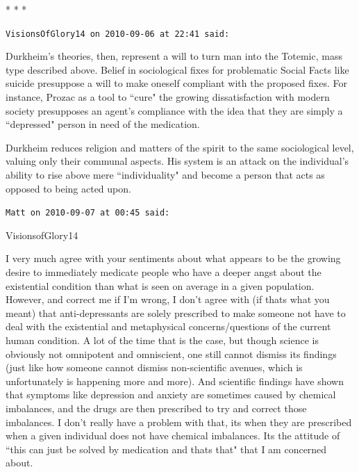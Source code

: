 
\begin{center}* * *\end{center}

\begin{footnotesize}\begin{sffamily}



\texttt{VisionsOfGlory14 on 2010-09-06 at 22:41 said: }

Durkheim's theories, then, represent a will to turn man into the Totemic, mass type described above. Belief in sociological fixes for problematic Social Facts like suicide presuppose a will to make oneself compliant with the proposed fixes. For instance, Prozac as a tool to ``cure" the growing dissatisfaction with modern society presupposes an agent's compliance with the idea that they are simply a ``depressed" person in need of the medication.

Durkheim reduces religion and matters of the spirit to the same sociological level, valuing only their communal aspects. His system is an attack on the individual's ability to rise above mere ``individuality" and become a person that acts as opposed to being acted upon.


\hfill

\texttt{Matt on 2010-09-07 at 00:45 said: }

VisionsofGlory14

I very much agree with your sentiments about what appears to be the growing desire to immediately medicate people who have a deeper angst about the existential condition than what is seen on average in a given population. However, and correct me if I'm wrong, I don't agree with (if thats what you meant) that anti-depressants are solely prescribed to make someone not have to deal with the existential and metaphysical concerns/questions of the current human condition. A lot of the time that is the case, but though science is obviously not omnipotent and omniscient, one still cannot dismiss its findings (just like how someone cannot dismiss non-scientific avenues, which is unfortunately is happening more and more). And scientific findings have shown that symptoms like depression and anxiety are sometimes caused by chemical imbalances, and the drugs are then prescribed to try and correct those imbalances. I don't really have a problem with that, its when they are prescribed when a given individual does not have chemical imbalances. Its the attitude of ``this can just be solved by medication and thats that" that I am concerned about.



\end{sffamily}
\end{footnotesize}
